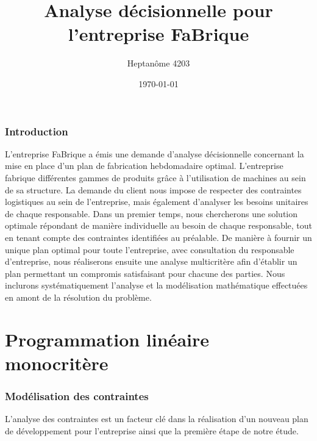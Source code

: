 \documentclass[a4paper,10pt]{article}
\title{Analyse décisionnelle pour l'entreprise FaBrique}
\author{Heptanôme 4203}
\date{\today}
\begin{document}
\maketitle 


\section*{Introduction}

  L'entreprise FaBrique a émis une demande d'analyse décisionnelle concernant la mise en place d'un plan de fabrication hebdomadaire optimal. L'entreprise fabrique différentes gammes de produits grâce à l'utilisation de machines au sein de sa structure. La demande du client nous impose de respecter des contraintes logistiques au sein de l'entreprise, mais également d'analyser les besoins unitaires de chaque responsable. Dans un premier temps, nous chercherons une solution optimale répondant de manière individuelle au besoin de chaque responsable, tout en tenant compte des contraintes identifiées au préalable. De manière à fournir un unique plan optimal pour toute l'entreprise, avec consultation du responsable d'entreprise, nous réaliserons ensuite une analyse multicritère afin d'établir un plan permettant un compromis satisfaisant pour chacune des parties. Nous inclurons systématiquement l'analyse et la modélisation mathématique effectuées en amont de la résolution du problème.


\part{Programmation linéaire monocritère}


\section{Modélisation des contraintes}
L'analyse des contraintes est un facteur clé dans la réalisation d'un nouveau plan de développement pour l'entreprise ainsi que la première étape de notre étude.
\vspace{\baselineskip}
\end{document}
